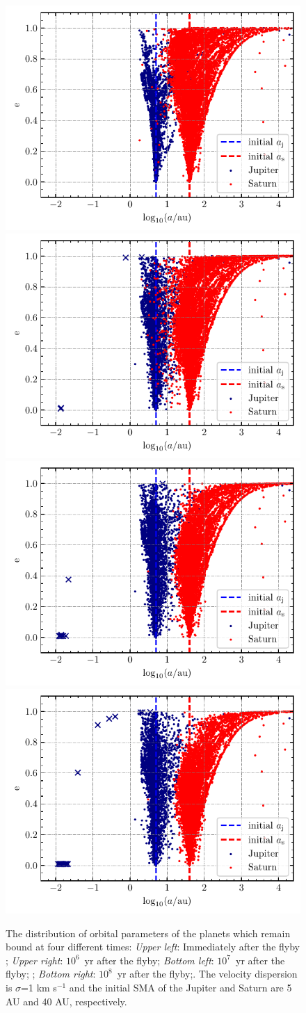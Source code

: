 \documentclass[twocolumn]{aastex63}
\begin{document}
\begin{figure}
    \includegraphics[width=.45\textwidth]{figs/ae-flyby_inone-r8.pdf}
    \includegraphics[width=.45\textwidth]{figs/ae-1e6_inone-r8.pdf}\\
    \includegraphics[width=.45\textwidth]{figs/ae-1e7_inone-r8.pdf}
    \includegraphics[width=.45\textwidth]{figs/ae-1e8_inone-r8.pdf}
    \caption{The distribution of orbital parameters of the planets which remain bound at four different times:
    \textit{Upper left}: Immediately after the flyby ; \textit{Upper right}: $10^6$~yr after the flyby; \textit{Bottom left}: $10^7$~yr after the flyby; ; \textit{Bottom right}: $10^8$~yr after the flyby;. The velocity dispersion is $\sigma$=1 km s$^{-1}$ and the initial SMA of the Jupiter and Saturn are 5 AU and 40 AU, respectively.}
    \label{Fig:a-etot-r8}
\end{figure}
\end{document}

